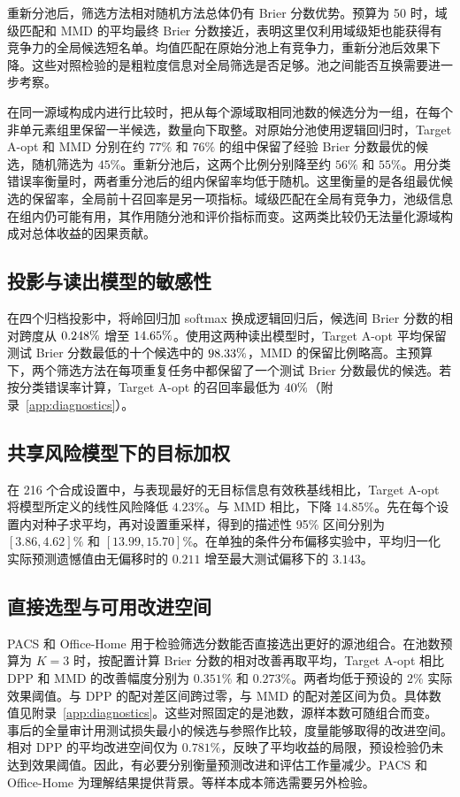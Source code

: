 \documentclass[UTF8,fontset=fandol,scheme=chinese,zihao=false,11pt,letterpaper]{ctexart}
\begin{document}
重新分池后，筛选方法相对随机方法总体仍有 Brier 分数优势。预算为 50 时，域级匹配和 MMD 的平均最终 Brier 分数接近，表明这里仅利用域级矩也能获得有竞争力的全局候选短名单。均值匹配在原始分池上有竞争力，重新分池后效果下降。这些对照检验的是粗粒度信息对全局筛选是否足够。池之间能否互换需要进一步考察。

在同一源域构成内进行比较时，把从每个源域取相同池数的候选分为一组，在每个非单元素组里保留一半候选，数量向下取整。对原始分池使用逻辑回归时，Target A-opt 和 MMD 分别在约 $77\%$ 和 $76\%$ 的组中保留了经验 Brier 分数最优的候选，随机筛选为 $45\%$。重新分池后，这两个比例分别降至约 $56\%$ 和 $55\%$。用分类错误率衡量时，两者重分池后的组内保留率均低于随机。这里衡量的是各组最优候选的保留率，全局前十召回率是另一项指标。域级匹配在全局有竞争力，池级信息在组内仍可能有用，其作用随分池和评价指标而变。这两类比较仍无法量化源域构成对总体收益的因果贡献。

\subsection{投影与读出模型的敏感性}
\label{sec:readout}
在四个归档投影中，将岭回归加 softmax 换成逻辑回归后，候选间 Brier 分数的相对跨度从 $0.248\%$ 增至 $14.65\%$。使用这两种读出模型时，Target A-opt 平均保留测试 Brier 分数最低的十个候选中的 $98.33\%$，MMD 的保留比例略高。主预算下，两个筛选方法在每项重复任务中都保留了一个测试 Brier 分数最优的候选。若按分类错误率计算，Target A-opt 的召回率最低为 $40\%$（附录~\ref{app:diagnostics}）。

\subsection{共享风险模型下的目标加权}
在 216 个合成设置中，与表现最好的无目标信息有效秩基线相比，Target A-opt 将模型所定义的线性风险降低 $4.23\%$。与 MMD 相比，下降 $14.85\%$。先在每个设置内对种子求平均，再对设置重采样，得到的描述性 95\% 区间分别为 $[3.86,4.62]\%$ 和 $[13.99,15.70]\%$。在单独的条件分布偏移实验中，平均归一化实际预测遗憾值由无偏移时的 $0.211$ 增至最大测试偏移下的 $3.143$。

\subsection{直接选型与可用改进空间}
PACS 和 Office-Home 用于检验筛选分数能否直接选出更好的源池组合。在池数预算为 $K=3$ 时，按配置计算 Brier 分数的相对改善再取平均，Target A-opt 相比 DPP 和 MMD 的改善幅度分别为 $0.351\%$ 和 $0.273\%$。两者均低于预设的 $2\%$ 实际效果阈值。与 DPP 的配对差区间跨过零，与 MMD 的配对差区间为负。具体数值见附录~\ref{app:diagnostics}。这些对照固定的是池数，源样本数可随组合而变。
事后的全量审计用测试损失最小的候选与参照作比较，度量能够取得的改进空间。相对 DPP 的平均改进空间仅为 $0.781\%$，反映了平均收益的局限，预设检验仍未达到效果阈值。因此，有必要分别衡量预测改进和评估工作量减少。PACS 和 Office-Home 为理解结果提供背景。等样本成本筛选需要另外检验。
\end{document}
